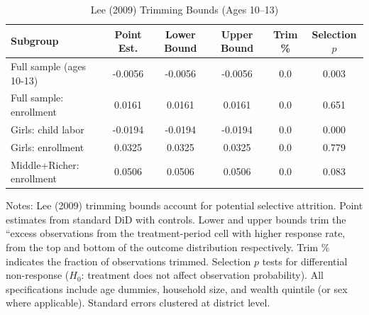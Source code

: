 \begin{table}[H]
\centering
\caption{Lee (2009) Trimming Bounds (Ages 10--13)}
\label{tab:lee_bounds}
\begin{threeparttable}
\begin{tabular}{lccccc}
\toprule
Subgroup & Point Est. & Lower Bound & Upper Bound & Trim \% & Selection $p$ \\
\midrule
Full sample (ages 10-13) & -0.0056 & -0.0056 & -0.0056 & 0.0 & 0.003 \\
Full sample: enrollment & 0.0161 & 0.0161 & 0.0161 & 0.0 & 0.651 \\
Girls: child labor & -0.0194 & -0.0194 & -0.0194 & 0.0 & 0.000 \\
Girls: enrollment & 0.0325 & 0.0325 & 0.0325 & 0.0 & 0.779 \\
Middle+Richer: enrollment & 0.0506 & 0.0506 & 0.0506 & 0.0 & 0.083 \\
\bottomrule
\end{tabular}
\begin{tablenotes}
\footnotesize
\item Notes: Lee (2009) trimming bounds account for potential selective attrition. Point estimates from standard DiD with controls. Lower and upper bounds trim the ``excess observations from the treatment-period cell with higher response rate, from the top and bottom of the outcome distribution respectively. Trim \% indicates the fraction of observations trimmed. Selection $p$ tests for differential non-response ($H_0$: treatment does not affect observation probability). All specifications include age dummies, household size, and wealth quintile (or sex where applicable). Standard errors clustered at district level.
\end{tablenotes}
\end{threeparttable}
\end{table}